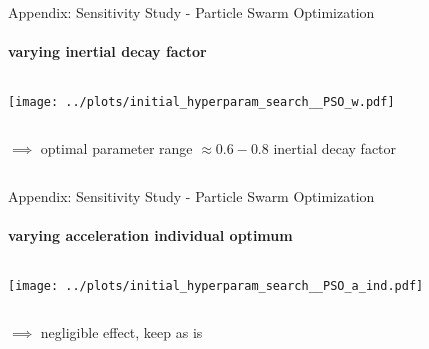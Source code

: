 \documentclass[11pt,aspectratio=169]{beamer}
\begin{document}
%
%

\begin{closingframe}{Appendix: Sensitivity Study - Particle Swarm Optimization}
    \framesubtitle{varying \textbf{inertial decay factor}}

    \begin{columns}
    \begin{column}{0.8\textwidth}
        \texttt{[image: ../plots/initial\_hyperparam\_search\_\_PSO\_w.pdf]}
    \end{column}
    \end{columns}

    \begin{columns}
        \begin{column}{0.8\textwidth}
            $\implies$ optimal parameter range $\approx 0.6 - 0.8$ inertial decay factor        \end{column}
        \begin{column}{0.1\textwidth}
            \tiny{}
        \end{column}
    \end{columns}
\end{closingframe}

%
%

\begin{closingframe}{Appendix: Sensitivity Study - Particle Swarm Optimization}
    \framesubtitle{varying \textbf{acceleration individual optimum}}

    \begin{columns}
    \begin{column}{0.8\textwidth}
        \texttt{[image: ../plots/initial\_hyperparam\_search\_\_PSO\_a\_ind.pdf]}
    \end{column}
    \end{columns}

    \begin{columns}
        \begin{column}{0.8\textwidth}
            $\implies$ negligible effect, keep as is
        \end{column}
        \begin{column}{0.1\textwidth}
            \tiny{}
        \end{column}
    \end{columns}
\end{closingframe}
\end{document}
